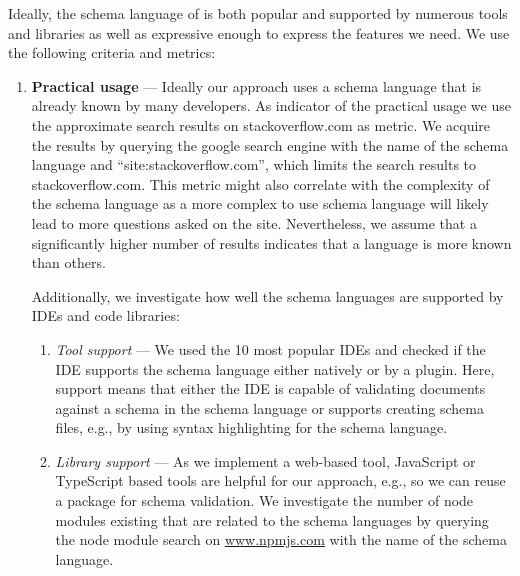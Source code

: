 Ideally, the schema language of \toolname{} is both popular and supported by numerous tools and libraries as well as expressive enough to express the features we need.
We use the following criteria and metrics:
\begin{enumerate}
    \item \textbf{Practical usage} --- Ideally our approach uses a schema language that is already known by many developers.
    As indicator of the practical usage we use the approximate search results on stackoverflow.com as metric.
    We acquire the results by querying the google search engine with the name of the schema language and ``site:stackoverflow.com'', which limits the search results to stackoverflow.com.
    This metric might also correlate with the complexity of the schema language as a more complex to use schema language will likely lead to more questions asked on the site.
    Nevertheless, we assume that a significantly higher number of results indicates that a language is more known than others.

    Additionally, we investigate how well the schema languages are supported by IDEs and code libraries:
    \begin{enumerate}
        \item \textit{Tool support} --- We used the 10 most popular IDEs\cite{mostpopularides} and checked if the IDE supports the schema language either natively or by a plugin.
        Here, support means that either the IDE is capable of validating documents against a schema in the schema language or supports creating schema files, e.g., by using syntax highlighting for the schema language.
        \item \textit{Library support} --- As we implement a web-based tool, JavaScript or TypeScript based tools are helpful for our approach, e.g., so we can reuse a package for schema validation.
        We investigate the number of node modules existing that are related to the schema languages by querying the node module search on \url{www.npmjs.com} with the name of the schema language.

    \end{enumerate}


\end{enumerate}
